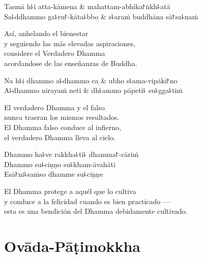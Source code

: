 \begin{twochants}
  Tasmā h꜕i atta-kāmena & mahattam-abhika꜓ṅkh꜕atā \\
  Sa꜕ddhammo ga꜕ru꜓-kāta꜕bbo & s꜕araṁ buddhāna sā꜓sa꜕naṁ \\
\end{twochants}

\begin{english}
  Así, anhelando el bienestar\\
  y seguiendo las más elevadas aspiraciones,\\
  considere el Verdadero Dhamma\\
  acordandose de las enseñanzas de Buddha.
\end{english}

\clearpage

\begin{twochants}
  Na h꜕i dhammo a꜕dhammo ca & ubho s꜕ama-vipāki꜓no \\
  A꜕dhammo nirayaṁ neti & dh꜕ammo pāpeti꜕ su꜕gga꜕tiṁ \\
\end{twochants}

\begin{english}
  El verdadero Dhamma y el falso\\
  nunca traeran los mismos resultados.\\
  El Dhamma falso conduce al infierno,\\
  el verdadero Dhamma lleva al cielo.
\end{english}

Dhammo ha꜕ve rakkha꜕ti꜕ dhamma꜓-cāriṁ\\
Dhammo su꜕ciṇṇo su꜕kham-āvahāti\\
Esā꜓ni꜕saṁso dhamme su꜕ciṇṇe


\begin{english}
  El Dhamma protege a aquél que lo cultiva\\
  y conduce a la felicidad cuando es bien practicado ---\\
  esta es una bendición del Dhamma debidamente cultivado.
\end{english}

\chapter{Ovāda-Pāṭimokkha}

